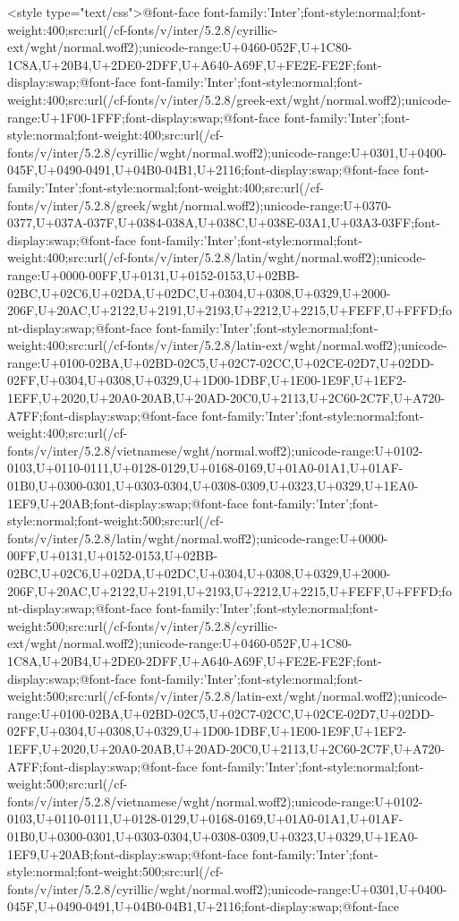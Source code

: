     <style type="text/css">@font-face {font-family:'Inter';font-style:normal;font-weight:400;src:url(/cf-fonts/v/inter/5.2.8/cyrillic-ext/wght/normal.woff2);unicode-range:U+0460-052F,U+1C80-1C8A,U+20B4,U+2DE0-2DFF,U+A640-A69F,U+FE2E-FE2F;font-display:swap;}@font-face {font-family:'Inter';font-style:normal;font-weight:400;src:url(/cf-fonts/v/inter/5.2.8/greek-ext/wght/normal.woff2);unicode-range:U+1F00-1FFF;font-display:swap;}@font-face {font-family:'Inter';font-style:normal;font-weight:400;src:url(/cf-fonts/v/inter/5.2.8/cyrillic/wght/normal.woff2);unicode-range:U+0301,U+0400-045F,U+0490-0491,U+04B0-04B1,U+2116;font-display:swap;}@font-face {font-family:'Inter';font-style:normal;font-weight:400;src:url(/cf-fonts/v/inter/5.2.8/greek/wght/normal.woff2);unicode-range:U+0370-0377,U+037A-037F,U+0384-038A,U+038C,U+038E-03A1,U+03A3-03FF;font-display:swap;}@font-face {font-family:'Inter';font-style:normal;font-weight:400;src:url(/cf-fonts/v/inter/5.2.8/latin/wght/normal.woff2);unicode-range:U+0000-00FF,U+0131,U+0152-0153,U+02BB-02BC,U+02C6,U+02DA,U+02DC,U+0304,U+0308,U+0329,U+2000-206F,U+20AC,U+2122,U+2191,U+2193,U+2212,U+2215,U+FEFF,U+FFFD;font-display:swap;}@font-face {font-family:'Inter';font-style:normal;font-weight:400;src:url(/cf-fonts/v/inter/5.2.8/latin-ext/wght/normal.woff2);unicode-range:U+0100-02BA,U+02BD-02C5,U+02C7-02CC,U+02CE-02D7,U+02DD-02FF,U+0304,U+0308,U+0329,U+1D00-1DBF,U+1E00-1E9F,U+1EF2-1EFF,U+2020,U+20A0-20AB,U+20AD-20C0,U+2113,U+2C60-2C7F,U+A720-A7FF;font-display:swap;}@font-face {font-family:'Inter';font-style:normal;font-weight:400;src:url(/cf-fonts/v/inter/5.2.8/vietnamese/wght/normal.woff2);unicode-range:U+0102-0103,U+0110-0111,U+0128-0129,U+0168-0169,U+01A0-01A1,U+01AF-01B0,U+0300-0301,U+0303-0304,U+0308-0309,U+0323,U+0329,U+1EA0-1EF9,U+20AB;font-display:swap;}@font-face {font-family:'Inter';font-style:normal;font-weight:500;src:url(/cf-fonts/v/inter/5.2.8/latin/wght/normal.woff2);unicode-range:U+0000-00FF,U+0131,U+0152-0153,U+02BB-02BC,U+02C6,U+02DA,U+02DC,U+0304,U+0308,U+0329,U+2000-206F,U+20AC,U+2122,U+2191,U+2193,U+2212,U+2215,U+FEFF,U+FFFD;font-display:swap;}@font-face {font-family:'Inter';font-style:normal;font-weight:500;src:url(/cf-fonts/v/inter/5.2.8/cyrillic-ext/wght/normal.woff2);unicode-range:U+0460-052F,U+1C80-1C8A,U+20B4,U+2DE0-2DFF,U+A640-A69F,U+FE2E-FE2F;font-display:swap;}@font-face {font-family:'Inter';font-style:normal;font-weight:500;src:url(/cf-fonts/v/inter/5.2.8/latin-ext/wght/normal.woff2);unicode-range:U+0100-02BA,U+02BD-02C5,U+02C7-02CC,U+02CE-02D7,U+02DD-02FF,U+0304,U+0308,U+0329,U+1D00-1DBF,U+1E00-1E9F,U+1EF2-1EFF,U+2020,U+20A0-20AB,U+20AD-20C0,U+2113,U+2C60-2C7F,U+A720-A7FF;font-display:swap;}@font-face {font-family:'Inter';font-style:normal;font-weight:500;src:url(/cf-fonts/v/inter/5.2.8/vietnamese/wght/normal.woff2);unicode-range:U+0102-0103,U+0110-0111,U+0128-0129,U+0168-0169,U+01A0-01A1,U+01AF-01B0,U+0300-0301,U+0303-0304,U+0308-0309,U+0323,U+0329,U+1EA0-1EF9,U+20AB;font-display:swap;}@font-face {font-family:'Inter';font-style:normal;font-weight:500;src:url(/cf-fonts/v/inter/5.2.8/cyrillic/wght/normal.woff2);unicode-range:U+0301,U+0400-045F,U+0490-0491,U+04B0-04B1,U+2116;font-display:swap;}@font-face 